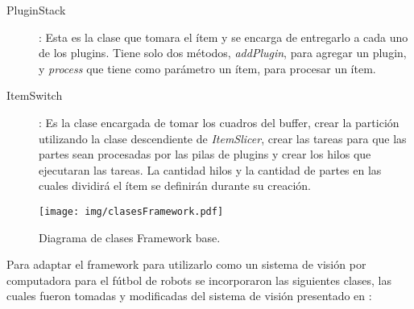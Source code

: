 \begin{description}
\item[PluginStack]: Esta es la clase que tomara el ítem y se encarga de
	entregarlo a cada uno de los plugins. Tiene solo dos métodos,
	\emph{addPlugin}, para agregar un plugin, y \emph{process} que tiene
	como parámetro un ítem, para procesar un ítem.

\item[ItemSwitch]: Es la clase encargada de tomar los cuadros del buffer, crear
	la partición utilizando la clase descendiente de \emph{ItemSlicer},
	crear las tareas para que las partes sean procesadas por las pilas de
	plugins y crear los hilos que ejecutaran las tareas. La cantidad hilos y
	la cantidad de partes en las cuales dividirá el ítem se definirán
	durante su creación.

\end{description}

\begin{figure}[h]

	\texttt{[image: img/clasesFramework.pdf]}

	\caption{Diagrama de clases Framework base.}

\end{figure}

Para adaptar el framework para utilizarlo como un sistema de visión por
computadora para el fútbol de robots se incorporaron las siguientes clases, las
cuales fueron tomadas y modificadas del sistema de visión presentado en
\cite{torres2014}:


